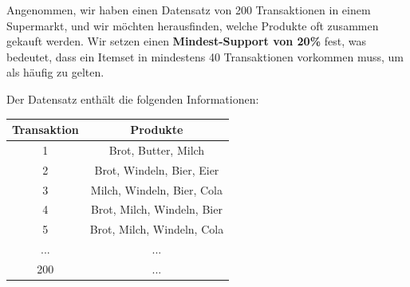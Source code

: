 \begin{myexample}
    Angenommen, wir haben einen Datensatz von 200 Transaktionen in einem Supermarkt, und wir möchten herausfinden, welche Produkte oft zusammen gekauft werden. Wir setzen einen \textbf{Mindest-Support von 20\%} fest, was bedeutet, dass ein Itemset in mindestens 40 Transaktionen vorkommen muss, um als häufig zu gelten.

    Der Datensatz enthält die folgenden Informationen:
    \begin{table}[H]
        \centering
        \begin{tabular}{c|c}
            \textbf{Transaktion} & \textbf{Produkte}          \\
            \midrule
            1                    & Brot, Butter, Milch        \\
            2                    & Brot, Windeln, Bier, Eier  \\
            3                    & Milch, Windeln, Bier, Cola \\
            4                    & Brot, Milch, Windeln, Bier \\
            5                    & Brot, Milch, Windeln, Cola \\
            ...                  & ...                        \\
            200                  & ...                        \\
        \end{tabular}


\end{table}
\end{myexample}
